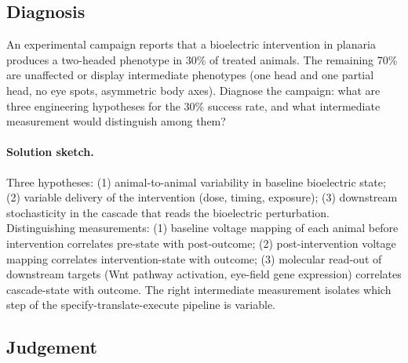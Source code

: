 \subsection*{Diagnosis}

\begin{exercise}
An experimental campaign reports that a bioelectric intervention in
planaria produces a two-headed phenotype in 30\% of treated animals.
The remaining 70\% are unaffected or display intermediate phenotypes
(one head and one partial head, no eye spots, asymmetric body axes).
Diagnose the campaign: what are three engineering hypotheses for the
30\% success rate, and what intermediate measurement would
distinguish among them?

\paragraph{Solution sketch.}
Three hypotheses: (1) animal-to-animal variability in baseline
bioelectric state; (2) variable delivery of the intervention (dose,
timing, exposure); (3) downstream stochasticity in the cascade that
reads the bioelectric perturbation. Distinguishing measurements:
(1) baseline voltage mapping of each animal before intervention
correlates pre-state with post-outcome; (2) post-intervention voltage
mapping correlates intervention-state with outcome; (3) molecular
read-out of downstream targets (Wnt pathway activation, eye-field
gene expression) correlates cascade-state with outcome. The right
intermediate measurement isolates which step of the
specify-translate-execute pipeline is variable.
\end{exercise}

\subsection*{Judgement}

